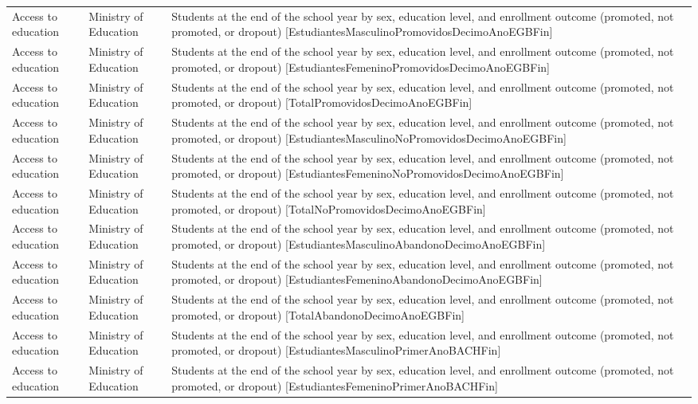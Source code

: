 \documentclass[10pt,a4paper]{article}
\begin{document}
\begin{longtable}{@{}>{\raggedright\arraybackslash}p{3.5cm}>{\raggedright\arraybackslash}p{5.6cm}>{\raggedright\arraybackslash}p{\dimexpr\textwidth-9.1cm-4\tabcolsep\relax}@{}}
Access to education & Ministry of Education & Students at the end of the school year by sex, education level, and enrollment outcome (promoted, not promoted, or dropout) [EstudiantesMasculinoPromovidosDecimoAnoEGBFin]\\
Access to education & Ministry of Education & Students at the end of the school year by sex, education level, and enrollment outcome (promoted, not promoted, or dropout) [EstudiantesFemeninoPromovidosDecimoAnoEGBFin]\\
Access to education & Ministry of Education & Students at the end of the school year by sex, education level, and enrollment outcome (promoted, not promoted, or dropout) [TotalPromovidosDecimoAnoEGBFin]\\
Access to education & Ministry of Education & Students at the end of the school year by sex, education level, and enrollment outcome (promoted, not promoted, or dropout) [EstudiantesMasculinoNoPromovidosDecimoAnoEGBFin]\\
Access to education & Ministry of Education & Students at the end of the school year by sex, education level, and enrollment outcome (promoted, not promoted, or dropout) [EstudiantesFemeninoNoPromovidosDecimoAnoEGBFin]\\
Access to education & Ministry of Education & Students at the end of the school year by sex, education level, and enrollment outcome (promoted, not promoted, or dropout) [TotalNoPromovidosDecimoAnoEGBFin]\\
Access to education & Ministry of Education & Students at the end of the school year by sex, education level, and enrollment outcome (promoted, not promoted, or dropout) [EstudiantesMasculinoAbandonoDecimoAnoEGBFin]\\
Access to education & Ministry of Education & Students at the end of the school year by sex, education level, and enrollment outcome (promoted, not promoted, or dropout) [EstudiantesFemeninoAbandonoDecimoAnoEGBFin]\\
Access to education & Ministry of Education & Students at the end of the school year by sex, education level, and enrollment outcome (promoted, not promoted, or dropout) [TotalAbandonoDecimoAnoEGBFin]\\
Access to education & Ministry of Education & Students at the end of the school year by sex, education level, and enrollment outcome (promoted, not promoted, or dropout) [EstudiantesMasculinoPrimerAnoBACHFin]\\
Access to education & Ministry of Education & Students at the end of the school year by sex, education level, and enrollment outcome (promoted, not promoted, or dropout) [EstudiantesFemeninoPrimerAnoBACHFin]\\

\end{longtable}
\end{document}
